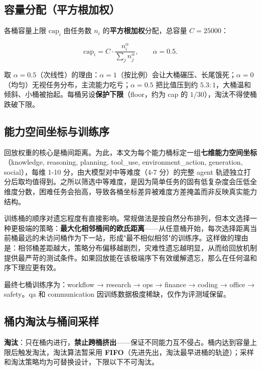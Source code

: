 \subsection{容量分配（平方根加权）}

各桶容量上限 $\text{cap}_i$ 由任务数 $n_i$ 的\textbf{平方根加权}分配，总容量 $C=25000$：

\begin{equation}
  \text{cap}_i = C\cdot \frac{n_i^{\alpha}}{\sum_j n_j^{\alpha}}, \qquad \alpha=0.5.
\end{equation}

取 $\alpha=0.5$（次线性）的理由：$\alpha=1$（按比例）会让大桶碾压、长尾饿死；$\alpha=0$（均匀）无视任务分布，主流能力吃亏；$\alpha=0.5$ 把比值压到约 $5.3\!:\!1$，大桶温和倾斜、小桶被抬起。每桶另设\textbf{保护下限}（floor，约为 cap 的 $1/30$），淘汰不得使桶跌破下限。

\subsection{能力空间坐标与训练序}

回放权重的核心是桶间距离。为此，本文为每个能力桶标定一组\textbf{七维能力空间坐标}（knowledge, reasoning, planning, tool\_use, environment\_action, generation, social），每维 1-10 分，由大模型对中等难度（4-7 分）的完整 agent 轨迹独立打分后取均值得到。之所以筛选中等难度，是因为简单任务的固有低复杂度会压低全维度分数，困难任务会抬高，导致各桶坐标差异被难度方差掩盖而非反映真实能力结构。

训练桶的顺序对遗忘程度有直接影响。常规做法是按自然分布排列，但本文选择一种更极端的策略：\textbf{最大化相邻桶间的欧氏距离}——从任意桶开始，每次选择距离当前桶最远的未访问桶作为下一站，形成"最不相似相邻"的训练序。这样做的理由是：相邻桶差距越大，策略分布偏移越剧烈，灾难性遗忘越明显，从而给回放机制提供最严苛的测试条件。如果回放能在该极端序下有效缓解遗忘，那么在任何温和序下理应更有效。

最终七桶训练序为：workflow → research → ops → finance → coding → office → safety。qa 和 communication 因训练数据极度稀缺，仅作为评测域保留。

\subsection{桶内淘汰与桶间采样}

\textbf{淘汰}：只在桶内进行，\textbf{禁止跨桶挤出}——保证不同能力互不侵占。桶内达到容量上限后触发淘汰，淘汰算法暂采用 \textbf{FIFO}（先进先出，淘汰最早进桶的轨迹）；采样和淘汰策略均为可替换设计，下限以下不可淘汰。


